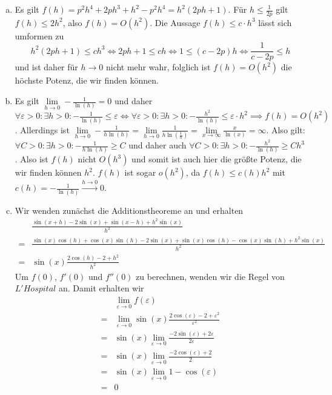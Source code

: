 \documentclass{article}
\theoremstyle{definition}
\newcommand{\equals}{\Longleftrightarrow}
\renewcommand{\epsilon}{\varepsilon}
\begin{document}
\begin{enumerate}[(a)]
	\item Es gilt $f(h) = p^2h^4 + 2ph^3 + h^2 - p^2 h^4 = h^2(2ph +1)$. Für $h \leq \frac{1}{2p}$ gilt $f(h) \leq 2h^2$, also $f(h) = O(h^2)$. Die Aussage $f(h) \leq c\cdot h^3$ lässt sich umformen zu
	$$h^2(2ph+1) \leq ch^3 \equals 2ph +1\leq ch \equals 1 \leq (c-2p)h \equals \frac{1}{c-2p} \leq h$$ und ist daher für $h\to 0$ nicht mehr wahr, folglich ist $f(h) = O(h^2)$ die höchste Potenz, die wir finden können.
	\item Es gilt $\lim\limits_{h\to 0}-\frac{1}{\ln(h)} = 0$ und daher $\forall \varepsilon > 0: \exists h > 0: -\frac{1}{\ln(h)} \leq \varepsilon \equals \forall \varepsilon > 0: \exists h> 0: -\frac{h^2}{\ln(h)} \leq \varepsilon \cdot h^2 \implies f(h) = O(h^2)$. Allerdings ist $\lim\limits_{h\to 0} -\frac{1}{h\ln(h)} = \lim\limits_{h\to 0} \frac{1}{h\ln(\frac{1}{h})} = \lim\limits_{x\to\infty}\frac{x}{\ln(x)} = \infty$. Also gilt: $\forall C > 0: \exists h >0: -\frac{1}{h\ln(h)} \geq C$ und daher auch $\forall C> 0: \exists h>0: -\frac{h^2}{\ln(h)} \geq Ch^3$. Also ist $f(h)$ nicht $O(h^3)$ und somit ist auch hier die größte Potenz, die wir finden können $h^2$. $f(h)$ ist sogar $o(h^2)$, da $f(h)  \leq c(h)h^2$ mit $c(h) = -\frac{1}{\ln(h)} \xrightarrow{h \to 0} 0$.
	\item Wir wenden zunächst die Additionstheoreme an und erhalten
	\begin{align*}
		&\frac{\sin(x+h) - 2\sin(x) + \sin(x-h) + h^2 \sin(x)}{h^2}\\
		=&\frac{\sin(x)\cos(h) + \cos(x)\sin(h) - 2\sin(x) + \sin(x)\cos(h) - \cos(x)\sin(h) + h^2 \sin(x)}{h^2}\\
		=& \sin(x)\frac{2\cos(h) - 2 + h^2}{h^2}
	\end{align*}
	Um $f(0)$, $f'(0)$ und $f''(0)$ zu berechnen, wenden wir die Regel von $L'Hospital$ an. Damit erhalten wir 
	\begin{align*}
		&\lim\limits_{\epsilon\to0}f(\epsilon)\\ 
		=&\lim\limits_{\epsilon\to0}\sin(x) \frac{2\cos(\epsilon) - 2 + \epsilon^2}{\epsilon^2}\\
		=&\sin(x)\lim\limits_{\epsilon\to0} \frac{-2\sin(\epsilon) + 2\epsilon}{2\epsilon}\\
		=&\sin(x)\lim\limits_{\epsilon\to0} \frac{-2\cos(\epsilon) + 2}{2}\\
		=&\sin(x) \lim\limits_{\epsilon\to0} 1 - \cos(\epsilon)\\
		=& 0
	\end{align*}

\end{enumerate}
\end{document}
